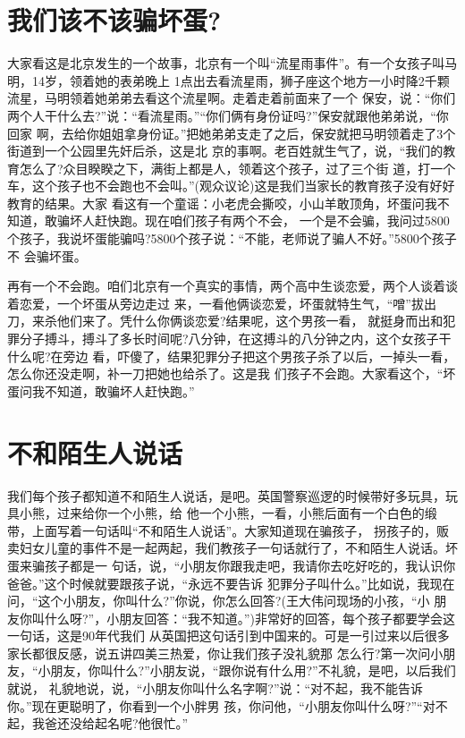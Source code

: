 \documentclass[11pt,a4paper,onecolumn]{article}
\begin{document}
\section{我们该不该骗坏蛋?}

大家看这是北京发生的一个故事，北京有一个叫``流星雨事件''。有一个女孩子叫马明，14岁，领着她的表弟晚上
1点出去看流星雨，狮子座这个地方一小时降2千颗流星，马明领着她弟弟去看这个流星啊。走着走着前面来了一个
保安，说：``你们两个人干什么去?''说：``看流星雨。''``你们俩有身份证吗?''保安就跟他弟弟说，``你回家
啊，去给你姐姐拿身份证。''把她弟弟支走了之后，保安就把马明领着走了3个街道到一个公园里先奸后杀，这是北
京的事啊。老百姓就生气了，说，``我们的教育怎么了?众目睽睽之下，满街上都是人，领着这个孩子，过了三个街
道，打一个车，这个孩子也不会跑也不会叫。''(观众议论)这是我们当家长的教育孩子没有好好教育的结果。大家
看这有一个童谣：小老虎会撕咬，小山羊敢顶角，坏蛋问我不知道，敢骗坏人赶快跑。现在咱们孩子有两个不会，
一个是不会骗，我问过5800个孩子，我说坏蛋能骗吗?5800个孩子说：``不能，老师说了骗人不好。''5800个孩子不
会骗坏蛋。

再有一个不会跑。咱们北京有一个真实的事情，两个高中生谈恋爱，两个人谈着谈着恋爱，一个坏蛋从旁边走过
来，一看他俩谈恋爱，坏蛋就特生气，``噌''拔出刀，来杀他们来了。凭什么你俩谈恋爱?结果呢，这个男孩一看，
就挺身而出和犯罪分子搏斗，搏斗了多长时间呢?八分钟，在这搏斗的八分钟之内，这个女孩子干什么呢?在旁边
看，吓傻了，结果犯罪分子把这个男孩子杀了以后，一掉头一看，怎么你还没走啊，补一刀把她也给杀了。这是我
们孩子不会跑。大家看这个，``坏蛋问我不知道，敢骗坏人赶快跑。''


\section{不和陌生人说话}

我们每个孩子都知道不和陌生人说话，是吧。英国警察巡逻的时候带好多玩具，玩具小熊，过来给你一个小熊，给
他一个小熊，一看，小熊后面有一个白色的缎带，上面写着一句话叫``不和陌生人说话''。大家知道现在骗孩子，
拐孩子的，贩卖妇女儿童的事件不是一起两起，我们教孩子一句话就行了，不和陌生人说话。坏蛋来骗孩子都是一
句话，说，``小朋友你跟我走吧，我请你去吃好吃的，我认识你爸爸。''这个时候就要跟孩子说，``永远不要告诉
犯罪分子叫什么。''比如说，我现在问，``这个小朋友，你叫什么?''你说，你怎么回答?(王大伟问现场的小孩，``小
朋友你叫什么呀?''，小朋友回答：``我不知道。'')非常好的回答，每个孩子都要学会这一句话，这是90年代我们
从英国把这句话引到中国来的。可是一引过来以后很多家长都很反感，说五讲四美三热爱，你让我们孩子没礼貌那
怎么行?第一次问小朋友，``小朋友，你叫什么?''小朋友说，``跟你说有什么用?''不礼貌，是吧，以后我们就说，
礼貌地说，说，``小朋友你叫什么名字啊?''说：``对不起，我不能告诉你。''现在更聪明了，你看到一个小胖男
孩，你问他，``小朋友你叫什么呀?''``对不起，我爸还没给起名呢?他很忙。''
\end{document}
